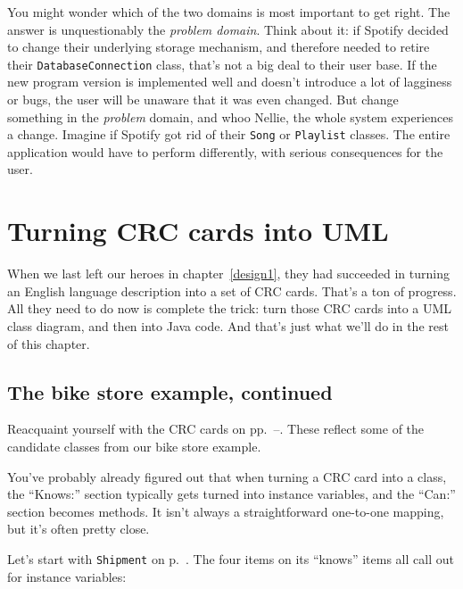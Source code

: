 You might wonder which of the two domains is most important to get right. The
answer is unquestionably the \textit{problem domain}. Think about it: if
Spotify decided to change their underlying storage mechanism, and therefore
needed to retire their \texttt{DatabaseConnection} class, that's not a big deal to their
user base. If the new program version is implemented well and doesn't
introduce a lot of lagginess or bugs, the user will be unaware that it was
even changed. But change something in the \textit{problem} domain, and whoo
Nellie, the whole system experiences a change. Imagine if Spotify got rid of
their \texttt{Song} or \texttt{Playlist} classes. The entire application would
have to perform differently, with serious consequences for the user.


\section{Turning CRC cards into UML}

When we last left our heroes in chapter~\ref{design1}, they had succeeded in
turning an English language description into a set of CRC cards. That's a ton
of progress. All they need to do now is complete the trick: turn those CRC
cards into a UML class diagram, and then into Java code. And that's just what
we'll do in the rest of this chapter.

\subsection{The bike store example, continued}

Reacquaint yourself with the CRC cards on
pp.~\pageref{bikeCRC1}--\pageref{bikeCRC2}. These reflect some of the candidate
classes from our bike store example.

You've probably already figured out that when turning a CRC card into a class,
the ``Knows:'' section typically gets turned into instance variables, and the
``Can:'' section becomes methods. It isn't always a straightforward one-to-one
mapping, but it's often pretty close.

Let's start with \texttt{Shipment} on p.~\pageref{bikeCRC1}. The four items on
its ``knows'' items all call out for instance variables:

